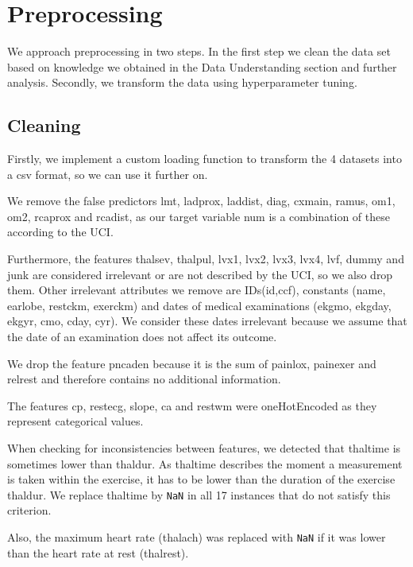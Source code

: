 \newpage
\section{Preprocessing}
We approach preprocessing in two steps. In the first step we clean the data set based on knowledge we obtained in the Data Understanding section and further analysis. 
Secondly, we transform the data using hyperparameter tuning.

\subsection{Cleaning}
Firstly, we implement a custom loading function to transform the 4 datasets into a csv format, so we can use it further on.

We remove the false predictors lmt, ladprox, laddist, diag, cxmain, ramus, om1, om2, rcaprox and rcadist, as our target variable num is a combination of these according to the UCI. %

Furthermore, the features thalsev, thalpul, lvx1, lvx2, lvx3, lvx4, lvf, dummy and junk are considered irrelevant or are not described by the UCI, so we also drop them. Other irrelevant attributes we remove are IDs(id,ccf), constants (name, earlobe, restckm, exerckm) and dates of medical examinations (ekgmo, ekgday, ekgyr, cmo, cday, cyr). We consider these dates irrelevant because we assume that the date of  an examination does not affect its outcome. 

We drop the feature pncaden because it is the sum of painlox, painexer and relrest and therefore contains no additional information. 

The features cp, restecg, slope, ca and restwm were oneHotEncoded as they represent categorical values.

When checking for inconsistencies between features, we detected that thaltime is sometimes lower than thaldur. As thaltime describes the moment a measurement is taken within the exercise, it has to be lower than the duration of the exercise thaldur. We replace thaltime by \texttt{NaN} in all 17 instances that do not satisfy this criterion. 

Also, the maximum heart rate (thalach) was replaced with \texttt{NaN} if it was lower than the heart rate at rest (thalrest).

